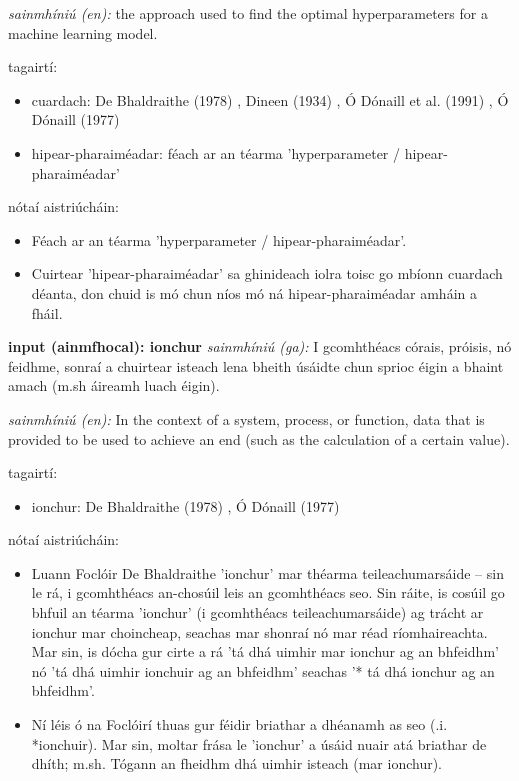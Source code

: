 \documentclass{article}
\begin{document}
\textit{sainmhíniú (en):} the approach used to find the optimal hyperparameters for a machine learning model.

tagairtí:
\begin{itemize}
	\item cuardach: De Bhaldraithe (1978) \cite{de-bhaldraithe}, Dineen (1934) \cite{dineen}, Ó Dónaill et al. (1991) \cite{focloir-beag}, Ó Dónaill (1977) \cite{odonaill}
	\item hipear-pharaiméadar: féach ar an téarma 'hyperparameter / hipear-pharaiméadar'
\end{itemize}

nótaí aistriúcháin:
\begin{itemize}
	\item Féach ar an téarma 'hyperparameter / hipear-pharaiméadar'.
	\item Cuirtear 'hipear-pharaiméadar' sa ghinideach iolra toisc go mbíonn cuardach déanta, don chuid is mó chun níos mó ná hipear-pharaiméadar amháin a fháil.
\end{itemize}


\textbf{input (ainmfhocal): ionchur}
\textit{sainmhíniú (ga):} I gcomhthéacs córais, próisis, nó feidhme, sonraí a chuirtear isteach lena bheith úsáidte chun sprioc éigin a bhaint amach (m.sh áireamh luach éigin).

\textit{sainmhíniú (en):} In the context of a system, process, or function, data that is provided to be used to achieve an end (such as the calculation of a certain value).

tagairtí:
\begin{itemize}
	\item ionchur: De Bhaldraithe (1978) \cite{de-bhaldraithe}, Ó Dónaill (1977) \cite{odonaill}
\end{itemize}

nótaí aistriúcháin:
\begin{itemize}
	\item Luann Foclóir De Bhaldraithe 'ionchur' mar théarma teileachumarsáide -- sin le rá, i gcomhthéacs an-chosúil leis an gcomhthéacs seo. Sin ráite, is cosúil go bhfuil an téarma 'ionchur' (i gcomhthéacs teileachumarsáide) ag trácht ar ionchur mar choincheap, seachas mar shonraí nó mar réad ríomhaireachta. Mar sin, is dócha gur cirte a rá 'tá dhá uimhir mar ionchur ag an bhfeidhm' nó 'tá dhá uimhir ionchuir ag an bhfeidhm' seachas '* tá dhá ionchur ag an bhfeidhm'.
	\item Ní léis ó na Foclóirí thuas gur féidir briathar a dhéanamh as seo (.i. *ionchuir). Mar sin, moltar frása le 'ionchur' a úsáid nuair atá briathar de dhíth; m.sh. Tógann an fheidhm dhá uimhir isteach (mar ionchur).
\end{itemize}
\end{document}
